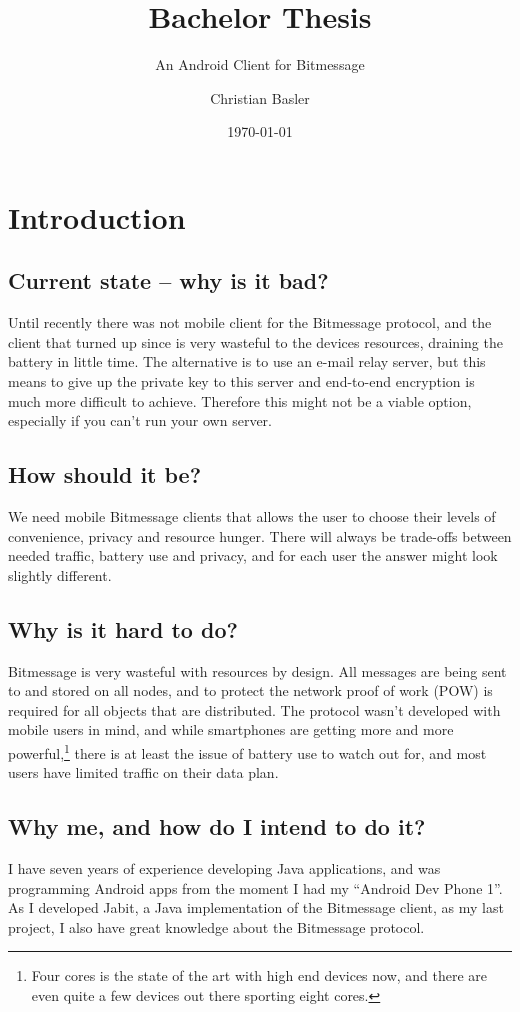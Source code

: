\documentclass{bfh}
\title{Bachelor Thesis}
\subtitle{An Android Client for Bitmessage}
\author{Christian Basler}
\date{\today}
\begin{document}
  \maketitle

  \tableofcontents
  \newpage

  \section{Introduction}

  \subsection{Current state -- why is it bad?}
  Until recently there was not mobile client for the Bitmessage protocol, and the client that turned up since is very wasteful to the devices resources, draining the battery in little time. The alternative is to use an e-mail relay server, but this means to give up the private key to this server and end-to-end encryption is much more difficult to achieve. Therefore this might not be a viable option, especially if you can't run your own server.

  \subsection{How should it be?}
  We need mobile Bitmessage clients that allows the user to choose their levels of convenience, privacy and resource hunger. There will always be trade-offs between needed traffic, battery use and privacy, and for each user the answer might look slightly different.

  \subsection{Why is it hard to do?}
  Bitmessage is very wasteful with resources by design. All messages are being sent to and stored on all nodes, and to protect the network proof of work (POW) is required for all objects that are distributed. The protocol wasn't developed with mobile users in mind, and while smartphones are getting more and more powerful,\footnote{Four cores is the state of the art with high end devices now, and there are even quite a few devices out there sporting eight cores.} there is at least the issue of battery use to watch out for, and most users have limited traffic on their data plan.

  \subsection{Why me, and how do I intend to do it?}
  I have seven years of experience developing Java applications, and was programming Android apps from the moment I had my ``Android Dev Phone 1''. As I developed Jabit, a Java implementation of the Bitmessage client, as my last project, I also have great knowledge about the Bitmessage protocol.
\end{document}
